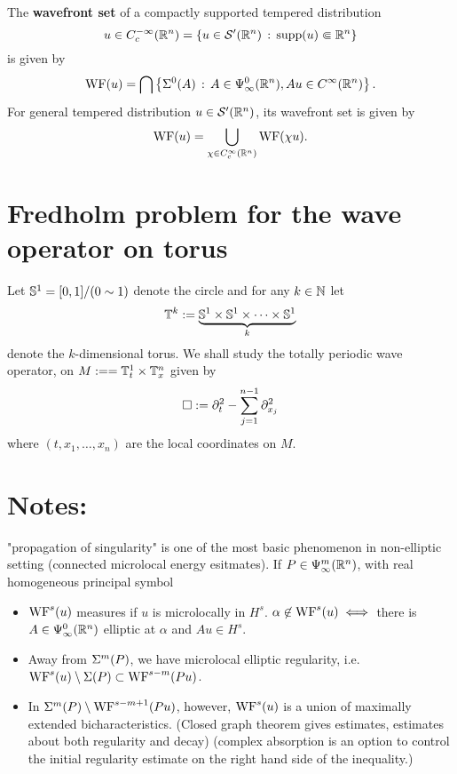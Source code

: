 \documentclass{article}
\begin{document}
\begin{fdefinition}
    The \textbf{wavefront set} of a compactly supported tempered distribution 
    \[
    u \in C^{-\infty}_c(\R^n) = \set{u \in \sch'(\R^n) \wh \supp(u) \Subset \R^n} 
    \]
    is given by 
    \begin{align*}
    \WF(u) = \bigcap \set{\Char^0(A) \wh A \in \Psi^0_\infty(\R^n), Au \in C^\infty(\R^n)}. 
    \end{align*}
    For general tempered distribution $u \in \sch'(\R^n)$, its wavefront set is given by 
    \begin{align*}
    \WF(u) = \bigcup_{\chi \in C^\infty_c(\R^n)} \WF(\chi u). 
    \end{align*}
\end{fdefinition} 



\section{Fredholm problem for the wave operator on torus} 

\begin{definition} 
    Let $\S^1 = [0,1] / (0 \sim 1)$ denote the circle and for any $k \in \N$ let
    \begin{align*}
    \T^k := \underbrace{\S^1 \times \S^1 \times \dots \times \S^1}_{k}
    \end{align*}
    denote the $k$-dimensional torus. We shall study the totally periodic wave operator, on $M :=  = \T_t^1 \times \T_x^{n}$ given by
    \begin{align}\label{eq: d'Alembertian}
    \Box := \p_t^2 - \sum_{j = 1}^{n -1} \p_{x_j}^2
    \end{align}
    where $(t, x_1, \dots, x_n)$ are the local coordinates on $M$. 
\end{definition}



\pagebreak 
\appendix
\section{Notes:}
"propagation of singularity" is one of the most basic phenomenon in non-elliptic setting (connected microlocal energy esitmates). If $P \in \Psi^{m}_{\infty}(\R^n)$, with real homogeneous principal symbol
\begin{itemize}
    \item $\WF^s(u)$ measures if $u$ is microlocally in $H^s$. $\alpha \not \in \WF^s(u) \iff $ there is $A \in \Psi^{0}_{\infty}(\R^n)$ elliptic at $\alpha$ and $Au \in H^s$. 
    \item Away from $\Char^m(P)$, we have microlocal elliptic regularity, i.e. $\WF^s(u) \setminus \Char(P) \subset \WF^{s - m}(Pu)$. 
    \item In $\Char^m(P) \setminus \WF^{s - m + 1}(Pu)$, however, $\WF^s(u)$ is a union of maximally extended bicharacteristics. (Closed graph theorem gives estimates, estimates about both regularity and decay) (complex absorption is an option to control the initial regularity estimate on the right hand side of the inequality.)
\end{itemize}
\end{document}

